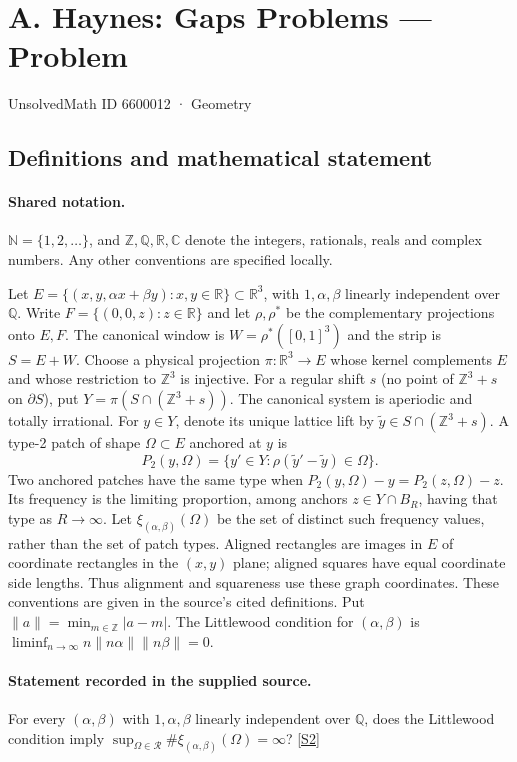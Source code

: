 \documentclass[11pt]{article}
\newcommand{\sref}[2]{\hyperlink{source:#1:#2}{[S#2]}}
\begin{document}
\setcounter{section}{6600011}
\section{A. Haynes: Gaps Problems — Problem}\label{6600012}
{\small\sffamily UnsolvedMath ID 6600012 · Geometry}
\subsection{Definitions and mathematical statement}

\paragraph{Shared notation.}$\mathbb N=\{1,2,\ldots\}$, and $\mathbb Z,\mathbb Q,\mathbb R,\mathbb C$ denote the integers, rationals, reals and complex numbers. Any other conventions are specified locally.


Let $E=\{(x,y,\alpha x+\beta y):x,y\in\mathbb R\}\subset\mathbb R^3$, with $1,\alpha,\beta$ linearly independent over $\mathbb Q$. Write $F=\{(0,0,z):z\in\mathbb R\}$ and let $\rho,\rho^*$ be the complementary projections onto $E,F$. The canonical window is $W=\rho^*([0,1]^3)$ and the strip is $S=E+W$. Choose a physical projection $\pi:\mathbb R^3\to E$ whose kernel complements $E$ and whose restriction to $\mathbb Z^3$ is injective. For a regular shift $s$ (no point of $\mathbb Z^3+s$ on $\partial S$), put $Y=\pi(S\cap(\mathbb Z^3+s))$. The canonical system is aperiodic and totally irrational. For $y\in Y$, denote its unique lattice lift by $\widetilde y\in S\cap(\mathbb Z^3+s)$. A type-2 patch of shape $\Omega\subset E$ anchored at $y$ is
\[P_2(y,\Omega)=\{y'\in Y:\rho(\widetilde y'-\widetilde y)\in\Omega\}.\]
Two anchored patches have the same type when $P_2(y,\Omega)-y=P_2(z,\Omega)-z$. Its frequency is the limiting proportion, among anchors $z\in Y\cap B_R$, having that type as $R\to\infty$. Let $\xi_{(\alpha,\beta)}(\Omega)$ be the set of distinct such frequency values, rather than the set of patch types. Aligned rectangles are images in $E$ of coordinate rectangles in the $(x,y)$ plane; aligned squares have equal coordinate side lengths. Thus alignment and squareness use these graph coordinates. These conventions are given in the source’s cited definitions. Put $\|a\|=\min_{m\in\mathbb Z}|a-m|$. The Littlewood condition for $(\alpha,\beta)$ is $\liminf_{n\to\infty}n\|n\alpha\|\|n\beta\|=0$.
\paragraph{Statement recorded in the supplied source.}
For every $(\alpha,\beta)$ with $1,\alpha,\beta$ linearly independent over $\mathbb Q$, does the Littlewood condition imply $\sup_{\Omega\in\mathcal R}\#\xi_{(\alpha,\beta)}(\Omega)=\infty$? \sref{6600012}{2}
\end{document}
